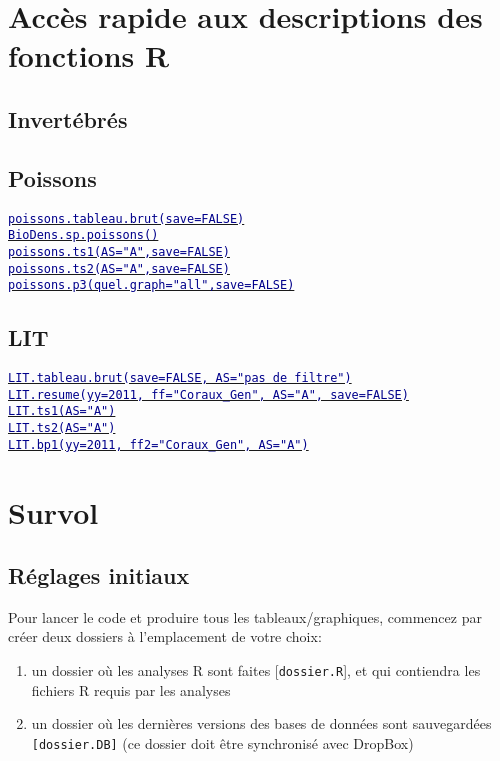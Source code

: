 \documentclass{article}
\begin{document}
\newcommand{\mcode} {\texttt{GS\_MotherCode.r}}
\newcommand{\bigtt}[1] {\textcolor{darkblue}{{\large {\texttt{#1}}}}}


\tableofcontents
\section{Accès rapide aux descriptions des fonctions R}
\subsection{Invertébrés}

\subsection{Poissons}
\hyperlink{p1} {\bigtt{poissons.tableau.brut(save=FALSE)}}\\
\hyperlink{p2} {\bigtt{BioDens.sp.poissons()}}\\
\hyperlink{p3} {\bigtt{poissons.ts1(AS="A",save=FALSE)}}\\
\hyperlink{p4} {\bigtt{poissons.ts2(AS="A",save=FALSE)}}\\
\hyperlink{p5} {\bigtt{poissons.p3(quel.graph="all",save=FALSE)}}
\subsection{LIT}
\hyperlink{l1} {\bigtt{LIT.tableau.brut(save=FALSE, AS="pas de filtre")}}\\
\hyperlink{l2} {\bigtt{LIT.resume(yy=2011, ff="Coraux\_Gen", AS="A",
    save=FALSE)}}\\
\hyperlink{l3} {\bigtt{LIT.ts1(AS="A")}}\\
\hyperlink{l4} {\bigtt{LIT.ts2(AS="A")}}\\
\hyperlink{l5} {\bigtt{LIT.bp1(yy=2011, ff2="Coraux\_Gen", AS="A")}}

\clearpage
\section{Survol}

\subsection*{Réglages initiaux}
Pour lancer le code et produire tous les tableaux/graphiques,
commencez par créer deux dossiers à l'emplacement de votre choix:
\begin{enumerate}
      \item un dossier où les analyses R sont faites
      [\texttt{dossier.R}], et qui contiendra les fichiers R requis par
      les analyses
  \item un dossier où les dernières versions des bases de données sont
    sauvegardées \texttt{[dossier.DB]} (ce dossier doit être
    synchronisé avec DropBox)
     \end{enumerate}
\end{document}
